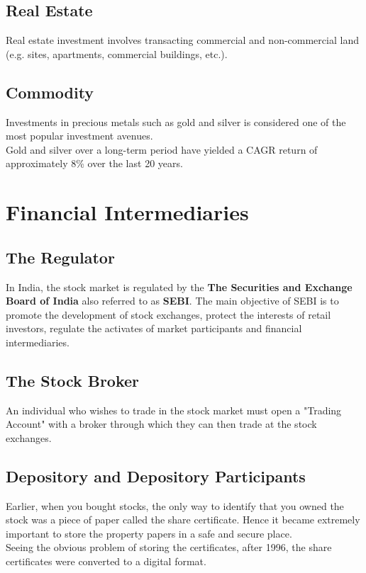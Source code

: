 \newpage

\subsection{Real Estate}
Real estate investment involves transacting commercial and non-commercial land (e.g. sites, apartments, commercial buildings, etc.).

\subsection{Commodity}
Investments in precious metals such as gold and silver is considered one of the most popular investment avenues.
\\
Gold and silver over a long-term period have yielded a CAGR return of approximately 8\% over the last 20 years.

\section{Financial Intermediaries}
\subsection{The Regulator}
In India, the stock market is regulated by the \textbf{The Securities and Exchange Board of India} also referred to as \textbf{SEBI}. The main objective of SEBI is to promote the development of stock exchanges, protect the interests of retail investors, regulate the activates of market participants and financial intermediaries.

\subsection{The Stock Broker}
An individual who wishes to trade in the stock market must open a "Trading Account" with a broker through which they can then trade at the stock exchanges.

\subsection{Depository and Depository Participants}
Earlier, when you bought stocks, the only way to identify that you owned the stock was a piece of paper called the share certificate. Hence it became extremely important to store the property papers in a safe and secure place.
\\
Seeing the obvious problem of storing the certificates, after 1996, the share certificates were converted to a digital format.

